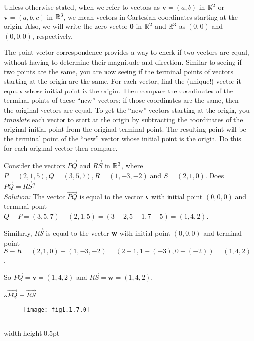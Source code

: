 Unless otherwise stated, when we refer to vectors as $\textbf{v} = (a,b)$ in $\mathbb{R}^{2}$ or $\textbf{v} = (a,b,c)$
in $\mathbb{R}^{3}$, we mean vectors in Cartesian coordinates starting at the origin.  Also, we will write
the zero vector $\textbf{0}$ in $\mathbb{R}^{2}$ and $\mathbb{R}^{3}$ as $(0,0)$ and $(0,0,0)$, respectively.

The point-vector correspondence provides a way to check if two vectors are equal, without having to determine their magnitude and direction.  
Similar to seeing if two points are the same, you are now seeing if the terminal points of vectors starting at the origin are the same.  
For each vector, find the (unique!) vector it equals whose initial point is the origin.  
Then compare the coordinates of the terminal points of these ``new'' vectors: 
if those coordinates are the same, then the original vectors are equal.  
To get the ``new'' vectors starting at the origin, you \emph{translate}
each vector to start at the origin by subtracting the coordinates of the original
initial point from the original terminal point.  The resulting point will be the terminal point of
the ``new'' vector whose initial point is the origin.  Do this for each original vector then compare.

\begin{exmp}
 Consider the vectors $\overrightarrow{PQ}$ and $\overrightarrow{RS}$ in $\mathbb{R}^{3}$, where $P = (2,1,5),
 Q = (3,5,7), R = (1,-3,-2)$ and $S = (2,1,0)$.  Does $\overrightarrow{PQ} =
 \overrightarrow{RS}$?\\\emph{Solution:}
 The vector $\overrightarrow{PQ}$ is equal to the vector \textbf{v} with
 initial point $(0,0,0)$ and terminal point $Q - P = (3,5,7) - (2,1,5) = (3 - 2,5 - 1,7 - 5) = (1,4,2)$.
 \par\noindent
 Similarly, $\overrightarrow{RS}$ is equal to the vector \textbf{w} with
 initial point $(0,0,0)$ and terminal point $S - R = (2,1,0) - (1,-3,-2) = (2 - 1, 1 - (-3),0 - (-2)) = (1,4,2)$.
 \par\noindent
 So $\overrightarrow{PQ} = \textbf{v} = (1,4,2)$ and $\overrightarrow{RS} = \textbf{w} = (1,4,2)$.
 \par\noindent
 $\therefore \overrightarrow{PQ} = \overrightarrow{RS}$
\end{exmp}
\begin{figure}[h]
 \begin{center}
  \texttt{[image: fig1.1.7.0]}
 \end{center}
 \caption[]{}
 \label{fig:ex1.2}
\end{figure}
\hrule width \textwidth height 0.5pt
\vspace{4mm}

